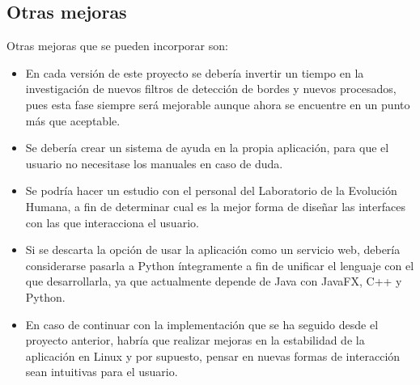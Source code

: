 \subsection{Otras mejoras}
Otras mejoras que se pueden incorporar son:
\begin{itemize}
\item En cada versión de este proyecto se debería invertir un tiempo en la investigación de nuevos filtros de detección de bordes y nuevos procesados, pues esta fase siempre será mejorable aunque ahora se encuentre en un punto más que aceptable.

\item Se debería crear un sistema de ayuda en la propia aplicación, para que el usuario no necesitase los manuales en caso de duda.

\item Se podría hacer un estudio con el personal del Laboratorio de la Evolución Humana, a fin de determinar cual es la mejor forma de diseñar las interfaces con las que interacciona el usuario.

\item Si se descarta la opción de usar la aplicación como un servicio web, debería considerarse pasarla a Python íntegramente a fin de unificar el lenguaje con el que desarrollarla, ya que actualmente depende de Java con JavaFX, C++ y Python.

\item En caso de continuar con la implementación que se ha seguido desde el proyecto anterior, habría que realizar mejoras en la estabilidad de la aplicación en Linux y por supuesto, pensar en nuevas formas de interacción sean intuitivas para el usuario.
\end{itemize}
